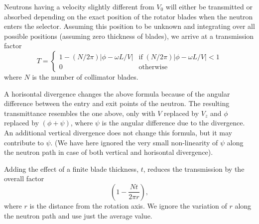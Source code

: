 Neutrons having a velocity slightly different from $V_0$
will either be transmitted or absorbed depending on the exact position
of the rotator blades when the neutron enters the selector.
Assuming this position to be unknown and integrating over all possible
positions (assuming zero thickness of blades), we arrive at a transmission factor
\begin{equation}
T = \left\{
 \begin{array}{ll}
 1 - (N/2\pi ) |\phi-\omega L / V| &
        \textrm{if}\;   (N/2\pi )|\phi -\omega L / V| < 1 \\
    0  &  \textrm{otherwise}
 \end{array} \right.
\end{equation}
where $N$ is the number of collimator blades.

A horisontal divergence changes the above formula because of the
angular difference between the entry and exit points of the neutron.
The resulting transmittance resembles the one above, only with
$V$ replaced by $V_z$ and $\phi$ replaced by $(\phi +\psi )$,
where $\psi$ is the angular difference due to
the divergence. An additional vertical divergence does not change
this formula, but it may contribute to $\psi$.
(We have here ignored the very small non-linearity of $\psi$ along the
neutron path in case of both vertical and horisontal divergence).

Adding the effect of a finite blade thickness, $t$, reduces the transmission
by the overall factor
\begin{equation}
\left( 1-\frac{N t}{2\pi r}  \right),
\end{equation}
where $r$ is the distance from the rotation axis. We ignore the variation
of $r$ along the neutron path and use just the average value.



